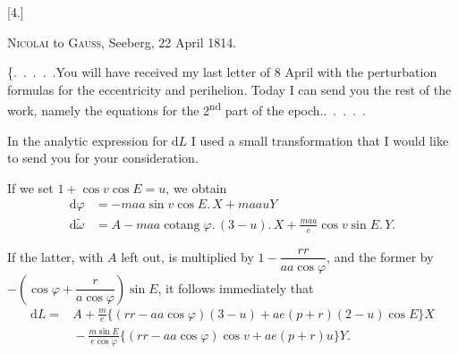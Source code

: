 \clearpage
\begingroup
{}
\renewcommand{\headrulewidth}{0pt}
\par\medskip
{}
\begin{center}
[4.]\par\medskip
\textsc{Nicolai} to \textsc{Gauss}, Seeberg, 22 April 1814.
\end{center}
\par\noindent\hspace*{\parindent}\{.\ .\ .\ .\ .\quad You will have received my last letter of 8 April with the perturbation formulas for
the eccentricity and perihelion. Today I can send you
the rest of the work, namely the equations for the 2\textsuperscript{nd}
part of the epoch.\quad .\ .\ .\ .\ .

\par\noindent\hspace*{\parindent}In the analytic expression for \(\mathrm{d}L\) I used a small transformation
that I would like to send you for your consideration.

\par\noindent\hspace*{\parindent}If we set \(1+\cos v\cos E=u\), we obtain
\[
\begin{aligned}
\mathrm{d}\varphi&=-maa\sin v\cos E\mathord{.}\,X+maauY\\
\mathrm{d}\tilde\omega&=A-maa\operatorname{cotang}\varphi\mathord{.}\,(3-u)\mathord{.}\,X
  +\frac{maa}{e}\cos v\sin E\mathord{.}\,Y.
\end{aligned}
\]

\par\noindent\hspace*{\parindent}If the latter, with \(A\) left out, is multiplied by \(1-\dfrac{rr}{aa\cos\varphi}\), and the former by
\(-\left(\cos\varphi+\dfrac{r}{a\cos\varphi}\right)\sin E\), it follows immediately that
\[
\begin{aligned}
\mathrm{d}L={}&A+\frac{m}{e}\bigl\{(rr-aa\cos\varphi)(3-u)+ae(p+r)(2-u)\cos E\bigr\}X\\
 &{}-\frac{m\sin E}{e\cos\varphi}\bigl\{(rr-aa\cos\varphi)\cos v+ae(p+r)u\bigr\}Y.
\end{aligned}
\]

